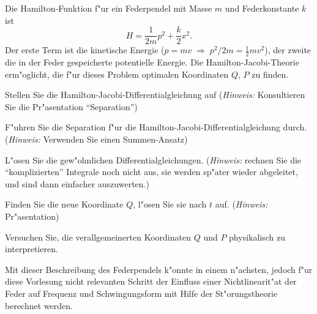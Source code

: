 Die Hamilton-Funktion f"ur ein Federpendel mit Masse $m$ und Federkonstante $k$
ist
\[
H=\frac1{2m}p^2+\frac{k}2x^2.
\]
Der erste Term ist die kinetische Energie ($p=mv\;\Rightarrow\;p^2/2m=\frac12mv^2$),
der zweite die in der Feder gespeicherte potentielle Energie.
Die Hamilton-Jacobi-Theorie erm"oglicht,
die f"ur dieses Problem optimalen Koordinaten $Q$, $P$ zu finden.
\begin{teilaufgaben}
\item Stellen Sie die Hamilton-Jacobi-Differentialgleichung auf ({\it Hinweis:}
Konsultieren Sie die Pr"asentation ``Separation'')
\item F"uhren Sie die Separation f"ur die Hamilton-Jacobi-Differentialgleichung
durch. ({\it Hinweis:} Verwenden Sie einen Summen-Ansatz)
\item L"osen Sie die gew"ohnlichen Differentialgleichungen.
({\it Hinweis:} rechnen Sie
die ``komplizierten'' Integrale noch nicht aus, sie werden sp"ater wieder
abgeleitet, und sind dann einfacher auszuwerten.)
\item Finden Sie die neue Koordinate $Q$, l"osen Sie sie nach $t$
auf. ({\it Hinweis:} Pr"asentation)
\item Versuchen Sie, die verallgemeinerten Koordinaten $Q$ und $P$ physikalisch
zu interpretieren.
\end{teilaufgaben}
Mit dieser Beschreibung des Federpendels k"onnte in einem n"achsten, jedoch f"ur
diese Vorlesung nicht relevanten Schritt der Einfluss einer Nichtlinearit"at
der Feder auf Frequenz und Schwingungsform mit Hilfe der St"orungstheorie
berechnet werden.

